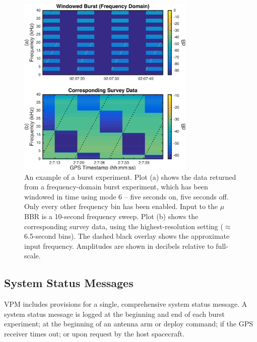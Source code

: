 \begin{figure}[t]
\begin{center}
\includegraphics[width=20pc]{figures/vpm_figures/burst_example.png}
\caption[Example of a frequency-domain burst experiment]{An example of a burst experiment. Plot (a) shows the data returned from a frequency-domain burst experiment, which has been windowed in time using mode 6 -- five seconds on, five seconds off. Only every other frequency bin has been enabled. Input to the $\mu$BBR is a 10-second frequency sweep. Plot (b) shows the corresponding survey data, using the highest-resolution setting ($\approx$ 6.5-second bins). The dashed black overlay shows the approximate input frequency. Amplitudes are shown in decibels relative to full-scale.}
\label{fig:example_data}
\end{center}
\end{figure}


\subsection{System Status Messages}
VPM includes provisions for a single, comprehensive system status message. A system status message is logged at the beginning and end of each burst experiment; at the beginning of an antenna arm or deploy command; if the GPS receiver times out; or upon request by the host spacecraft.

